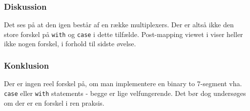 {    

\subsubsection{Diskussion}

Det ses på  at den igen består af en række multiplexers. Der er altså ikke den store forskel på \texttt{with} og \texttt{case} i dette tilfælde. Post-mapping viewet i  viser heller ikke nogen forskel, i forhold til sidste øvelse.

\subsubsection{Konklusion}

Der er ingen reel forskel på, om man implementere en binary to 7-segment vha. \texttt{case} eller \texttt{with} statements - begge er lige velfungerende. Det bør dog undersøges om der er en forskel i ren praksis.
        
}